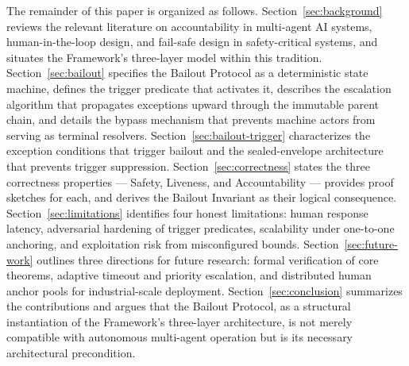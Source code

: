 The remainder of this paper is organized as follows. Section~\ref{sec:background} reviews the relevant literature on accountability in multi-agent AI systems, human-in-the-loop design, and fail-safe design in safety-critical systems, and situates the \bxthree{} Framework's three-layer model within this tradition. Section~\ref{sec:bailout} specifies the Bailout Protocol as a deterministic state machine, defines the trigger predicate that activates it, describes the escalation algorithm that propagates exceptions upward through the immutable parent chain, and details the bypass mechanism that prevents machine actors from serving as terminal resolvers. Section~\ref{sec:bailout-trigger} characterizes the exception conditions that trigger bailout and the sealed-envelope architecture that prevents trigger suppression. Section~\ref{sec:correctness} states the three correctness properties — Safety, Liveness, and Accountability — provides proof sketches for each, and derives the Bailout Invariant as their logical consequence. Section~\ref{sec:limitations} identifies four honest limitations: human response latency, adversarial hardening of trigger predicates, scalability under one-to-one anchoring, and exploitation risk from misconfigured bounds. Section~\ref{sec:future-work} outlines three directions for future research: formal verification of core theorems, adaptive timeout and priority escalation, and distributed human anchor pools for industrial-scale deployment. Section~\ref{sec:conclusion} summarizes the contributions and argues that the Bailout Protocol, as a structural instantiation of the \bxthree{} Framework's three-layer architecture, is not merely compatible with autonomous multi-agent operation but is its necessary architectural precondition.
